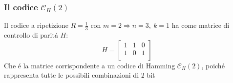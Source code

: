         \subsubsection{Il codice $\mathcal{C}_H(2)$}
            \begin{sloppypar}
                Il codice a ripetizione ${R=\frac{1}{3}}$ con ${m=2\Rightarrow n=3,\ k=1}$ ha come matrice di controllo di paritá $H$:
                \[
                    H = \begin{bmatrix}
                            1  & 1 & 0 \\
                            1  & 0 & 1 \\
                        \end{bmatrix} 
                \]
                Che é la matrice corrispondente a un codice di Hamming $\mathcal{C}_H(2)$, poiché rappresenta tutte le possibili combinazioni di 2 bit
            \end{sloppypar}

